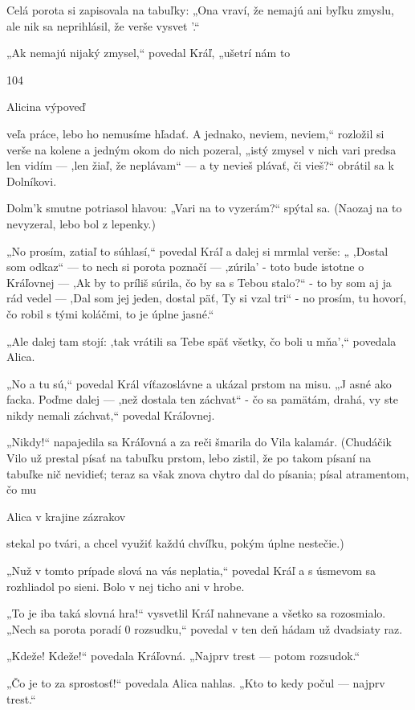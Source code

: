 \documentclass[12pt]{article}
\begin{document}
\begin{Parallel}[p]{}{}
{{Celá porota si zapisovala na tabuľky: „Ona vraví, že
nemajú ani byľku zmyslu, ale nik sa neprihlásil, že verše
vysvet '.“

„Ak nemajú nijaký zmysel,“ povedal Kráľ, „ušetrí nám to

104

Alicina výpoveď

veľa práce, lebo ho nemusíme hľadať. A jednako, neviem,
neviem,“ rozložil si verše na kolene a jedným okom do nich
pozeral, „istý zmysel v nich vari predsa len vidím — ,len žiaľ,
že neplávam“ — a ty nevieš plávať, či vieš?“ obrátil sa
k Dolníkovi.

Dolm'k smutne potriasol hlavou: „Vari na to vyzerám?“
spýtal sa. (Naozaj na to nevyzeral, lebo bol z lepenky.)

„No prosím, zatiaľ to súhlasí,“ povedal Kráľ a dalej si
mrmlal verše: „ ,Dostal som odkaz“ — to nech si porota
poznačí — ,zúrila' - toto bude istotne o Kráľovnej — ,Ak by
to príliš súrila, čo by sa s Tebou stalo?“ - to by som aj ja rád
vedel — ,Dal som jej jeden, dostal päť, Ty si vzal tri“ - no
prosím, tu hovorí, čo robil s tými koláčmi, to je úplne
jasné.“

„Ale dalej tam stojí: ,tak vrátili sa Tebe späť všetky, čo
boli u mňa',“ povedala Alica.

„No a tu sú,“ povedal Král víťazoslávne a ukázal prstom
na misu. „J asné ako facka. Poďme dalej — ,než dostala ten
záchvat“ - čo sa pamätám, drahá, vy ste nikdy nemali
záchvat,“ povedal Kráľovnej.

„Nikdy!“ napajedila sa Kráľovná a za reči šmarila do Vila
kalamár. (Chudáčik Vilo už prestal písať na tabuľku prstom,
lebo zistil, že po takom písaní na tabuľke nič nevidieť; teraz
sa však znova chytro dal do písania; písal atramentom, čo mu

 

Alica v krajine zázrakov

stekal po tvári, a chcel využiť každú chvíľku, pokým úplne
nestečie.)

„Nuž v tomto prípade slová na vás neplatia,“ povedal
Kráľ a s úsmevom sa rozhliadol po sieni. Bolo v nej ticho ani
v hrobe.

„To je iba taká slovná hra!“ vysvetlil Kráľ nahnevane
a všetko sa rozosmialo. „Nech sa porota poradí 0 rozsudku,“
povedal v ten deň hádam už dvadsiaty raz.

„Kdeže! Kdeže!“ povedala Kráľovná. „Najprv trest
— potom rozsudok.“

„Čo je to za sprostosť!“ povedala Alica nahlas. „Kto to
kedy počul — najprv trest.“

}}
\end{Parallel}
\end{document}
